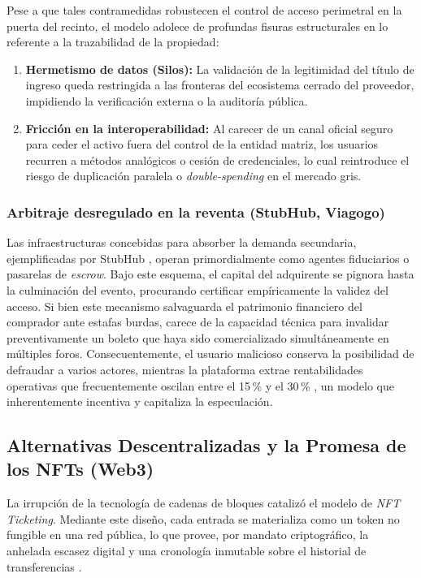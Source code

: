 Pese a que tales contramedidas robustecen el control de acceso perimetral en la puerta del recinto, el modelo
adolece de profundas fisuras estructurales en lo referente a la trazabilidad de la propiedad:
\begin{enumerate}
    \item \textbf{Hermetismo de datos (Silos):} La validación de la legitimidad del título de ingreso queda
restringida a las fronteras del ecosistema cerrado del proveedor, impidiendo la verificación externa o la
auditoría pública.
    \item \textbf{Fricción en la interoperabilidad:} Al carecer de un canal oficial seguro para ceder el
activo fuera del control de la entidad matriz, los usuarios recurren a métodos analógicos o cesión de
credenciales, lo cual reintroduce el riesgo de duplicación paralela o \textit{double-spending} en el mercado
gris.
\end{enumerate}

\subsubsection{Arbitraje desregulado en la reventa (StubHub, Viagogo)}

Las infraestructuras concebidas para absorber la demanda secundaria, ejemplificadas por StubHub \cite{stubhub2024}, operan primordialmente como agentes fiduciarios o pasarelas de \textit{escrow}. Bajo este esquema, el capital del adquirente se pignora hasta la culminación del evento, procurando certificar empíricamente la validez del acceso. Si bien este mecanismo salvaguarda el patrimonio financiero del comprador ante estafas burdas, carece de la capacidad técnica para invalidar preventivamente un boleto que haya sido comercializado simultáneamente en múltiples foros. Consecuentemente, el usuario malicioso conserva la posibilidad de defraudar a varios actores, mientras la plataforma extrae rentabilidades operativas que frecuentemente oscilan entre el 15\,\% y el 30\,\% \cite{scand2023ticketing}, un modelo que inherentemente incentiva y capitaliza la especulación.

\subsection{Alternativas Descentralizadas y la Promesa de los NFTs (Web3)}

La irrupción de la tecnología de cadenas de bloques catalizó el modelo de \textit{NFT Ticketing}. Mediante
este diseño, cada entrada se materializa como un token no fungible en una red pública, lo que provee, por
mandato criptográfico, la anhelada escasez digital y una cronología inmutable sobre el historial de
transferencias \cite{ieee2023nft}.

